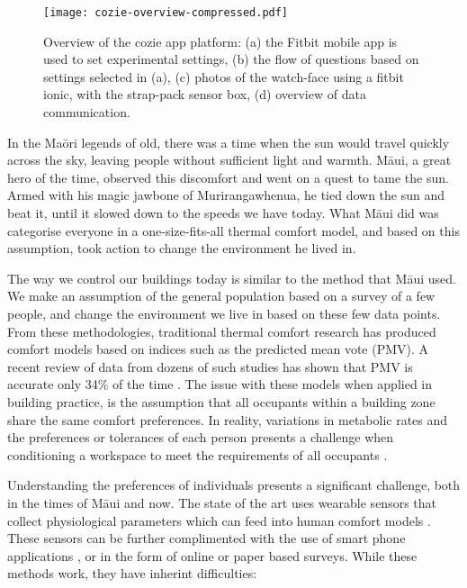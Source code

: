
\begin{figure}
\begin{center}
\texttt{[image: cozie-overview-compressed.pdf]}
\caption{Overview of the cozie app platform: (a) the Fitbit mobile app is used to set experimental settings, (b) the flow of questions based on settings selected in (a), (c) photos of the watch-face using a fitbit ionic, with the strap-pack sensor box, (d) overview of data communication.}
\label{fig:homescreen}
\end{center}
\end{figure}

In the Ma\={o}ri legends of old, there was a time when the sun would travel quickly across the sky, leaving people without sufficient light and warmth. M\={a}ui, a great hero of the time, observed this discomfort and went on a quest to tame the sun. Armed with his magic jawbone of Murirangawhenua, he tied down the sun and beat it, until it slowed down to the speeds we have today. What M\={a}ui did was categorise everyone in a one-size-fits-all thermal comfort model, and based on this assumption, took action to change the environment he lived in. 

The way we control our buildings today is similar to the method that M\={a}ui used. We make an assumption of the general population based on a survey of a few people, and change the environment we live in based on these few data points. From these methodologies, traditional thermal comfort research has produced comfort models based on indices such as the predicted mean vote (PMV). A recent review of data from dozens of such studies has shown that PMV is accurate only 34\% of the time \cite{CHEUNG2019205}. The issue with these models when applied in building practice, is the assumption that all occupants within a building zone share the same comfort preferences. In reality, variations in metabolic rates and the preferences or tolerances of each person presents a challenge when conditioning a workspace to meet the requirements of all occupants \cite{kim2018personal}. %

Understanding the preferences of individuals presents a significant challenge, both in the times of M\={a}ui and now. The state of the art uses wearable sensors that collect physiological parameters which can feed into human comfort models \cite{liu2018personal}. These sensors can be further complimented with the use of smart phone applications \cite{barrios2017comfstat}, or in the form of online or paper based surveys. While these methods work, they have inherint difficulties:

